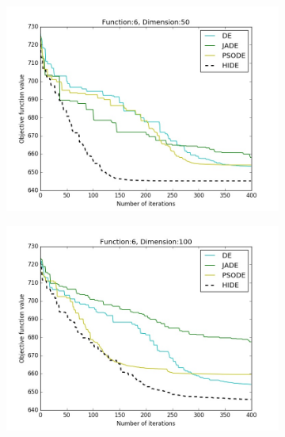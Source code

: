 \documentclass[a4paper,twoside]{article}
\begin{document}
\begin{figure}[h!]
    \begin{subfigure}[b]{0.24\textwidth}
        \includegraphics[width=\textwidth,natwidth=800,natheight=600]{plot_50D_F6_save}
        \caption{}
    \end{subfigure}
    \begin{subfigure}[b]{0.24\textwidth}
        \includegraphics[width=\textwidth,natwidth=800,natheight=600]{plot_100D_F6_save}
        \caption{}
    \end{subfigure}        
    \begin{subfigure}[b]{0.24\textwidth}

\end{subfigure}
\end{figure}
\end{document}
